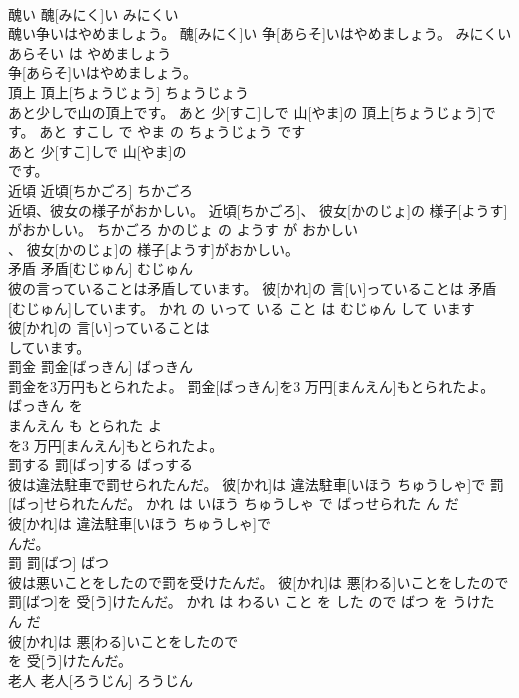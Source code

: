 \documentclass[8pt]{extreport}
\begin{document}
\begin{CJK}{UTF8}{min}
\\	醜い	醜[みにく]い	みにくい	
\\	醜い争いはやめましょう。	醜[みにく]い 争[あらそ]いはやめましょう。	みにくい あらそい は やめましょう	
\\	争[あらそ]いはやめましょう。			
\\	頂上	頂上[ちょうじょう]	ちょうじょう	
\\	あと少しで山の頂上です。	あと 少[すこ]しで 山[やま]の 頂上[ちょうじょう]です。	あと すこし で やま の ちょうじょう です	
\\	あと 少[すこ]しで 山[やま]の
\\	です。			
\\	近頃	近頃[ちかごろ]	ちかごろ	
\\	近頃、彼女の様子がおかしい。	近頃[ちかごろ]、 彼女[かのじょ]の 様子[ようす]がおかしい。	ちかごろ かのじょ の ようす が おかしい	
\\	、 彼女[かのじょ]の 様子[ようす]がおかしい。			
\\	矛盾	矛盾[むじゅん]	むじゅん	
\\	彼の言っていることは矛盾しています。	彼[かれ]の 言[い]っていることは 矛盾[むじゅん]しています。	かれ の いって いる こと は むじゅん して います	
\\	彼[かれ]の 言[い]っていることは
\\	しています。			
\\	罰金	罰金[ばっきん]	ばっきん	
\\	罰金を3万円もとられたよ。	罰金[ばっきん]を3 万円[まんえん]もとられたよ。	ばっきん を 
\\	まんえん も とられた よ	
\\	を3 万円[まんえん]もとられたよ。			
\\	罰する	罰[ばっ]する	ばっする	
\\	彼は違法駐車で罰せられたんだ。	彼[かれ]は 違法駐車[いほう ちゅうしゃ]で 罰[ばっ]せられたんだ。	かれ は いほう ちゅうしゃ で ばっせられた ん だ	
\\	彼[かれ]は 違法駐車[いほう ちゅうしゃ]で
\\	んだ。			
\\	罰	罰[ばつ]	ばつ	
\\	彼は悪いことをしたので罰を受けたんだ。	彼[かれ]は 悪[わる]いことをしたので 罰[ばつ]を 受[う]けたんだ。	かれ は わるい こと を した ので ばつ を うけた ん だ	
\\	彼[かれ]は 悪[わる]いことをしたので
\\	を 受[う]けたんだ。			
\\	老人	老人[ろうじん]	ろうじん	

\end{CJK}
\end{document}
